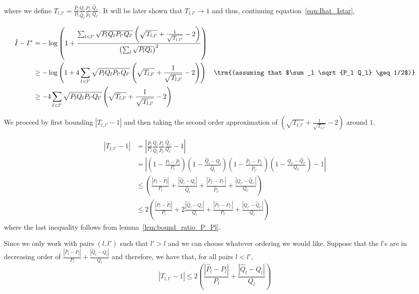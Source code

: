 \documentclass{article}
\begin{document}
where we define $T_{l,l'} = \frac{\hat{P}_l}{P_l} \frac{Q_l}{\hat{Q}_l} 
      \frac{P_{l'}}{\hat{P}_{l'}} \frac{\hat{Q}_{l'}}{Q_{l'}}  $. It will be later shown that $T_{l,l'} \rightarrow 1$ and thus, continuing equation~\ref{eqn:Ihat_Istar},

\begin{align}
\hat{I} - I^* &= - \log \left( 1 + \frac{ \sum_{l<l'} \sqrt{P_l Q_l P_{l'} Q_{l'}} 
    \left( \sqrt{T_{l,l'}} + \frac{1}{\sqrt{T_{l,l'}}} - 2 \right)}
    { \left( \sum_l \sqrt{ P_l Q_l} \right)^2 }  \right) \nonumber \\
     &  \geq  - \log \left( 1 + 4 \sum_{l<l'} \sqrt{P_l Q_l P_{l'} Q_{l'}}  
    \left( \sqrt{T_{l,l'}} + \frac{1}{\sqrt{T_{l,l'}}} - 2 \right)  \right) 
  \quad \trm{(assuming that $\sum_l \sqrt{P_l Q_l} \geq 1/2$)} \nonumber \\
   & \geq - 4 \sum_{l < l'} \sqrt{P_l Q_l P_{l'} Q_{l'}} 
    \left( \sqrt{T_{l,l'}} + \frac{1}{\sqrt{T_{l,l'}}} - 2 \right) \label{eqn:Ihat_Istar2}
\end{align}

We proceed by first bounding $|T_{l,l'} - 1|$ and then taking the second order approximation of $\left( \sqrt{T_{l,l'}} + \frac{1}{\sqrt{T_{l,l'}}} - 2 \right)$ around $1$. 

\begin{align*}
|T_{l,l'} - 1| &= \left| \frac{\hat{P}_l}{P_l} \frac{Q_l}{\hat{Q}_l} 
      \frac{P_{l'}}{\hat{P}_{l'}} \frac{\hat{Q}_{l'}}{Q_{l'}} - 1 \right| \\
 &= \left| \left( 1 - \frac{P_l - \hat{P}_l}{P_l} \right)
    \left( 1 - \frac{\hat{Q}_l - Q_l}{\hat{Q}_l} \right)
   \left( 1- \frac{\hat{P}_{l'} - P_{l'}}{\hat{P}_{l'}}\right)
   \left( 1 -  \frac{Q_{l'}- \hat{Q}_{l'}}{Q_{l'}} \right) -1 \right| \\
&\leq \left( \frac{|P_l - \hat{P}_l|}{P_l} +  \frac{|\hat{Q}_l - Q_l|}{\hat{Q}_l}
           +   \frac{| \hat{P}_{l'} - P_{l'}|}{\hat{P}_{l'}} +
               \frac{| Q_{l'} - \hat{Q}_{l'} | }{Q_{l'}} \right) \\
& \leq 2\left( \frac{|P_l - \hat{P}_l|}{P_l} +  2\frac{|\hat{Q}_l - Q_l|}{Q_l}
           +   \frac{| \hat{P}_{l'} - P_{l'}|}{P_{l'}} +
               \frac{| Q_{l'} - \hat{Q}_{l'} | }{Q_{l'}} \right) 
\end{align*}
where the last inequality follows from lemma~\ref{lem:bound_ratio_P_Pl}.

Since we only work with pairs $(l, l')$ such that $l' > l$ and we can choose whatever ordering we would like. Suppose that the $l$'s are in decreasing order of $\frac{|\hat{P}_l - P_l|}{P_l} + \frac{|\hat{Q}_l - Q_l|}{Q_l}$ and therefore, we have that, for all pairs $l < l'$, 
\[
| T_{l,l'} - 1 | \leq 2 
    \left( \frac{|\hat{P}_l - P_l|}{P_l} + \frac{|\hat{Q}_l - Q_l|}{Q_l} \right)
\]
\end{document}
